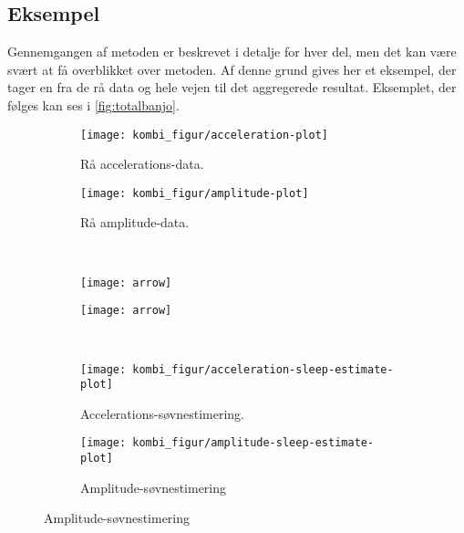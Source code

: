 \subsection{Eksempel}
Gennemgangen af metoden er beskrevet i detalje for hver del, men det kan være svært at få overblikket over metoden.
Af denne grund gives her et eksempel, der tager en fra de rå data og hele vejen til det aggregerede resultat.
Eksemplet, der følges kan ses i \cref{fig:totalbanjo}.
\begin{figure}
	\begin{minipage}{\linewidth}
		\begin{subfigure}{0.5\linewidth}
			\centering
			\texttt{[image: kombi\_figur/acceleration-plot]}
			\caption{Rå accelerations-data.}\label{fig:rawaccplot}
		\end{subfigure}
		\begin{subfigure}{0.5\linewidth}
			\centering
			\texttt{[image: kombi\_figur/amplitude-plot]}
			\caption{Rå amplitude-data.}\label{fig:rawamplplot}
		\end{subfigure}
	\end{minipage}\\[1ex]%
	\begin{minipage}{\linewidth}
		\begin{subfigure}{0.5\linewidth}
			\centering
			\texttt{[image: arrow]}
		\end{subfigure}
		\begin{subfigure}{0.5\linewidth}
			\centering
			\texttt{[image: arrow]}
		\end{subfigure}
	\end{minipage}\\[1ex]%
	\begin{minipage}{\linewidth}
		\begin{subfigure}{0.5\linewidth}
			\centering
			\texttt{[image: kombi\_figur/acceleration-sleep-estimate-plot]}
			\caption{Accelerations-søvnestimering.}\label{fig:sleepcalcaccplot}
		\end{subfigure}
		\begin{subfigure}{0.5\linewidth}
			\centering
			\texttt{[image: kombi\_figur/amplitude-sleep-estimate-plot]}
			\caption{Amplitude-søvnestimering}\label{fig:sleepcalcamplplot}

\end{subfigure}
\end{minipage}
\end{figure}
